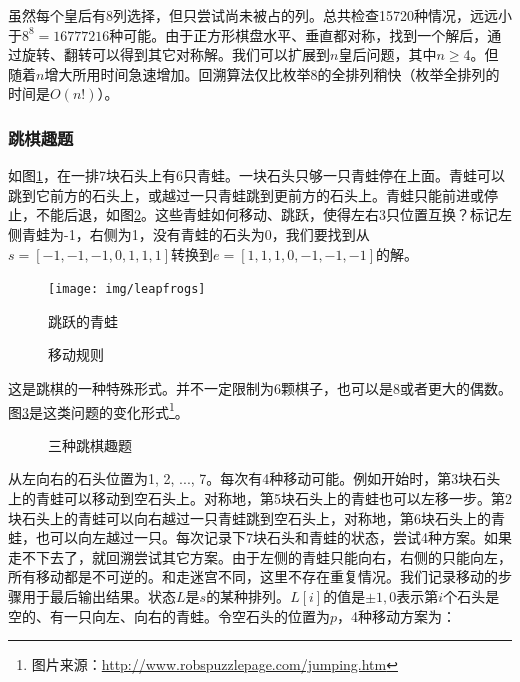 \documentclass[b5paper]{ctexart}
\begin{document}
虽然每个皇后有8列选择，但只尝试尚未被占的列。总共检查15720种情况，远远小于$8^8 = 16777216$种可能\cite{wiki-8-queens}。由于正方形棋盘水平、垂直都对称，找到一个解后，通过旋转、翻转可以得到其它对称解。我们可以扩展到$n$皇后问题，其中$n \geq 4$。但随着$n$增大所用时间急速增加。回溯算法仅比枚举8的全排列稍快（枚举全排列的时间是$O(n!)$）。

\subsubsection{跳棋趣题}

如图\ref{fig:leapfrog}，在一排7块石头上有6只青蛙。一块石头只够一只青蛙停在上面。青蛙可以跳到它前方的石头上，或越过一只青蛙跳到更前方的石头上。青蛙只能前进或停止，不能后退，如图\ref{fig:pegrules}。这些青蛙如何移动、跳跃，使得左右3只位置互换？标记左侧青蛙为-1，右侧为1，没有青蛙的石头为0，我们要找到从$s = [-1, -1, -1, 0, 1, 1, 1]$转换到$e = [1, 1, 1, 0, -1, -1, -1]$的解。

\begin{figure}[htbp]
 \centering
 \texttt{[image: img/leapfrogs]}
 \caption{跳跃的青蛙}
 \label{fig:leapfrog}
\end{figure}

\begin{figure}[htbp]
 \centering
  \hspace{0.02\textwidth}
  \hspace{0.02\textwidth}
 \caption{移动规则}
 \label{fig:pegrules}
\end{figure}

这是跳棋的一种特殊形式。并不一定限制为6颗棋子，也可以是8或者更大的偶数。图\ref{fig:pegpuzzles}是这类问题的变化形式\footnote{图片来源：\url{http://www.robspuzzlepage.com/jumping.htm}}。

\begin{figure}[htbp]
 \centering
  \hspace{0.02\textwidth}
  \hspace{0.02\textwidth}
 \caption{三种跳棋趣题}
 \label{fig:pegpuzzles}
\end{figure}

从左向右的石头位置为1, 2, ..., 7。每次有4种移动可能。例如开始时，第3块石头上的青蛙可以移动到空石头上。对称地，第5块石头上的青蛙也可以左移一步。第2块石头上的青蛙可以向右越过一只青蛙跳到空石头上，对称地，第6块石头上的青蛙，也可以向左越过一只。每次记录下7块石头和青蛙的状态，尝试4种方案。如果走不下去了，就回溯尝试其它方案。由于左侧的青蛙只能向右，右侧的只能向左，所有移动都是不可逆的。和走迷宫不同，这里不存在重复情况。我们记录移动的步骤用于最后输出结果。状态$L$是$s$的某种排列。$L[i]$的值是$\pm 1, 0$表示第$i$个石头是空的、有一只向左、向右的青蛙。令空石头的位置为$p$，4种移动方案为：
\end{document}

